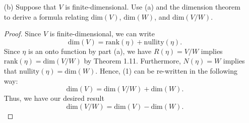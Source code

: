 \begin{enumerate}
\begin{proof}
            Lastly, we will prove that \( N(\eta) =  W  \). Let \( x \in N(\eta) \). Then \( \eta(x) = W  \). By definition of \( \eta \), we must have that \( \eta(x) = x + W \). Hence, \( x + W = W  \). By Exercise 1.3.31, we get that \( x \in W  \). Thus, \( N(\eta) \subseteq W  \). On the other hand, \( x \in W  \) implies that \( W = x + W  \). By definition of \( \eta  \), we get that \( \eta(x) = W  \). Since \( W   \) is the zero vector defined on \( V / W  \), we must have \( x \in N(\eta) \) and hence \( W \subseteq N(\eta) \). Thus, \( N(\eta) = W  \).
        \end{proof}
    \item[(b)] Suppose that \( V  \) is finite-dimensional. Use (a) and the dimension theorem to derive a formula relating \( \text{dim}(V) \), \( \text{dim}(W) \), and \( \text{dim}(V / W ) \).
        \begin{proof}
        Since \( V  \) is finite-dimensional, we can write
        \[  \text{dim}(V) = \text{rank}(\eta) + \text{nullity}(\eta). \tag{1}  \] 
        Since \( \eta  \) is an onto function by part (a), we have \( R(\eta) = V /W   \) implies \( \text{rank}(\eta) =  \text{dim}(V /W ) \) by Theorem 1.11. Furthermore, \( N(\eta) = W  \) implies that \( \text{nullity}(\eta) = \text{dim}(W) \). Hence, (1) can be re-written in the following way:
        \[  \text{dim}(V) = \text{dim}(V/W) + \text{dim}(W). \]
        Thus, we have our desired result
        \[  \text{dim}(V /W ) = \text{dim}(V) - \text{dim}(W). \] 
        \end{proof}
\end{enumerate}

